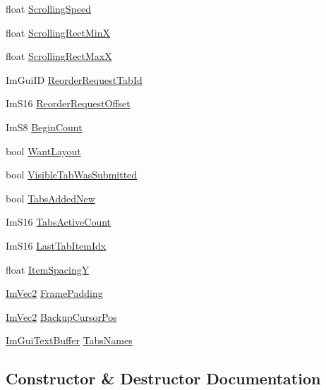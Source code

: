 \begin{DoxyCompactItemize}
\item 
float \hyperlink{structImGuiTabBar_a402f9de25e4323587d9f289678896fca}{Scrolling\+Speed}
\item 
float \hyperlink{structImGuiTabBar_acce137ab8e247117d97cf10e3d1df9ae}{Scrolling\+Rect\+MinX}
\item 
float \hyperlink{structImGuiTabBar_a0d1248e9b1c325c590084e119e3268a0}{Scrolling\+Rect\+MaxX}
\item 
Im\+Gui\+ID \hyperlink{structImGuiTabBar_a63b10062043a569efbb55462602d7b27}{Reorder\+Request\+Tab\+Id}
\item 
Im\+S16 \hyperlink{structImGuiTabBar_af719bc9df71e0472f4ce4fb11615b53f}{Reorder\+Request\+Offset}
\item 
Im\+S8 \hyperlink{structImGuiTabBar_ae8ab845e23ad911c3a4c45880acfb64f}{Begin\+Count}
\item 
bool \hyperlink{structImGuiTabBar_acf92c2132df97eae310b391d894d261d}{Want\+Layout}
\item 
bool \hyperlink{structImGuiTabBar_a9112067953a14bc707d2660dc1cf93b0}{Visible\+Tab\+Was\+Submitted}
\item 
bool \hyperlink{structImGuiTabBar_a616acfd5a38deb934c5a079b458ca5a9}{Tabs\+Added\+New}
\item 
Im\+S16 \hyperlink{structImGuiTabBar_a577cacc6ee39195b59a48f347549c4e2}{Tabs\+Active\+Count}
\item 
Im\+S16 \hyperlink{structImGuiTabBar_a552e9e99f0e46873b43db1859a5df452}{Last\+Tab\+Item\+Idx}
\item 
float \hyperlink{structImGuiTabBar_afaa62d532c31dded8f5102e8c504ab7e}{Item\+SpacingY}
\item 
\hyperlink{structImVec2}{Im\+Vec2} \hyperlink{structImGuiTabBar_aa0319aebb5c59e026486f60b68642ee6}{Frame\+Padding}
\item 
\hyperlink{structImVec2}{Im\+Vec2} \hyperlink{structImGuiTabBar_a075db95c9c1e0cb223c4ed050b47e9ab}{Backup\+Cursor\+Pos}
\item 
\hyperlink{structImGuiTextBuffer}{Im\+Gui\+Text\+Buffer} \hyperlink{structImGuiTabBar_afe5bda8cfea073a5d51a1d2bc023ef74}{Tabs\+Names}
\end{DoxyCompactItemize}


\subsection{Constructor \& Destructor Documentation}
\mbox{\label{structImGuiTabBar_a7d04467b887730a184365fdb3cb5bb17}} 
